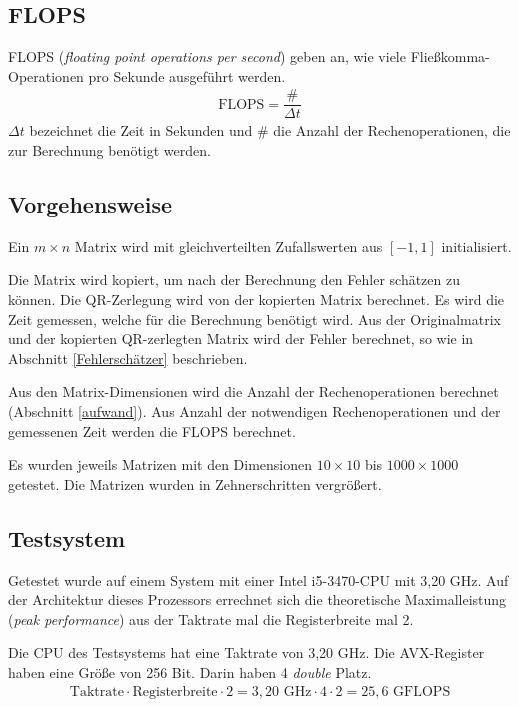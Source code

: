 \subsection{FLOPS}
FLOPS (\textit{floating point operations per second}) geben an, wie viele Fließkomma-Operationen pro Sekunde ausgeführt werden.
\begin{align*}
  \text{FLOPS} = \dfrac{\#}{\Delta t}
\end{align*}
$\Delta t$ bezeichnet die Zeit in Sekunden und $\#$ die Anzahl der Rechenoperationen, die zur Berechnung benötigt werden.

\subsection{Vorgehensweise}

Ein $m \times n$ Matrix wird mit gleichverteilten Zufallswerten aus $[-1,1]$ initialisiert.

Die Matrix wird kopiert, um nach der Berechnung den Fehler schätzen zu können. Die QR-Zerlegung wird von der kopierten Matrix berechnet. Es wird die Zeit gemessen, welche für die Berechnung benötigt wird. 
Aus der Originalmatrix und der kopierten QR-zerlegten Matrix wird der Fehler berechnet, so wie in Abschnitt \ref{Fehlerschätzer} beschrieben.

Aus den Matrix-Dimensionen wird die Anzahl der Rechenoperationen berechnet (Abschnitt \ref{aufwand}).
Aus Anzahl der notwendigen Rechenoperationen und der gemessenen Zeit werden die FLOPS berechnet.

Es wurden jeweils Matrizen mit den Dimensionen $10 \times 10$ bis $1000 \times 1000$  getestet. Die Matrizen wurden in Zehnerschritten vergrößert.


\subsection{Testsystem}

Getestet wurde auf einem System mit einer Intel i5-3470-CPU mit 3,20 GHz. 
Auf der Architektur dieses Prozessors errechnet sich die theoretische Maximalleistung (\textit{peak performance}) aus der Taktrate mal die Registerbreite mal 2. 


Die CPU des Testsystems hat eine Taktrate von 3,20 GHz.
Die AVX-Register haben eine Größe von 256 Bit.
Darin haben 4 \textit{double} Platz.
\begin{align*}
  \text{Taktrate} \cdot \text{Registerbreite} \cdot 2= 3,20 \text{ GHz} \cdot 4 \cdot 2 = 25,6 \text{ GFLOPS}
\end{align*}


